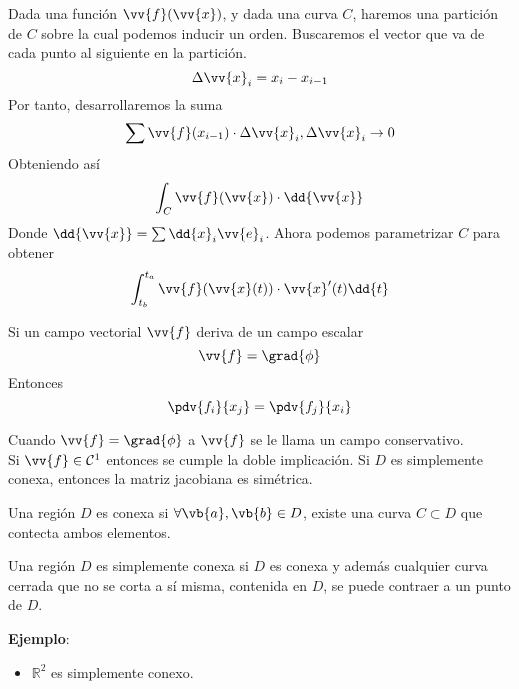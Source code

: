 \documentclass{./Calculo.tex}
\begin{document}
 Dada una función $\vv{f}(\vv{x})$, y dada una curva $C$, haremos una
 partición de $C$ sobre la cual podemos inducir un orden. Buscaremos el
 vector que va de cada punto al siguiente en la partición.
 \[
 	\Delta \vv{x}_{i} = x_{i} - x_{i-1}
 \]
 Por tanto, desarrollaremos la suma
 \[
 	\sum \vv{f}(x_{i-1}) \cdot  \Delta \vv{x}_{i}, \Delta \vv{x}_{i} \to 0
 \]
 Obteniendo así
 \begin{equation}
 	\begin{split}
 		\int_{C} \vv{f}(\vv{x}) \cdot \dd{\vv{x}}
 	\end{split}
 \end{equation}
 Donde $\dd{\vv{x}} = \sum \dd{x}_{i} \vv{e}_{i}$. Ahora podemos parametrizar
 $C$ para obtener
 \begin{equation}
 	\begin{split}
		\int_{t_{b}}^{t_{a}} \vv{f}(\vv{x}(t))\cdot \vv{x}'(t) \dd{t}
 	\end{split}
 \end{equation}
 \begin{teorema}
 	Si un campo vectorial $\vv{f}$ deriva de un campo escalar
	\[
		\vv{f} = \grad{\phi}
	\]
	Entonces
	\[
		\pdv{f_{i}}{x_{j}} = \pdv{f_{j}}{x_{i}}
	\]
 \end{teorema}
 Cuando $\vv{f} = \grad{\phi}$ a $\vv{f}$ se le llama un campo conservativo.\\
 Si $\vv{f} \in \mathcal{C}^{1}$ entonces se cumple la doble implicación. Si $D$ es simplemente
 conexa, entonces la matriz jacobiana es simétrica.
 \begin{defin}
 	Una región $D$ es conexa si $\forall \vb{a}, \vb{b} \in D$, existe una curva $C \subset D$
	que contecta ambos elementos.
 \end{defin}
 \begin{defin}
 	Una región $D$ es simplemente conexa si $D$ es conexa y además cualquier curva cerrada que 
	no se corta a sí misma, contenida en $D$, se puede contraer a un punto de $D$.  
 \end{defin}
 \textbf{Ejemplo}:
 \begin{itemize}
 	\item $\mathbb{R} ^{2}$ es simplemente conexo. 
 \end{itemize}
\end{document}
